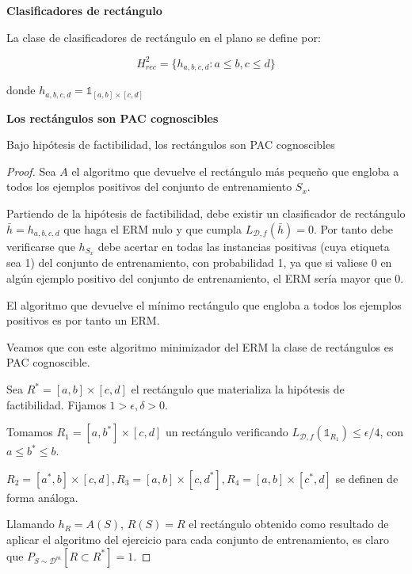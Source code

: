 \begin{example}
  \begin{definition*} \textbf{Clasificadores de rectángulo}

  La clase de clasificadores de rectángulo en el plano se define por:

  \[H^2_{rec} = \{ h_{a,b,c,d}: a\le b, c\le d\}\]

  donde $h_{a,b,c,d} = \mathds{1}_{[a,b]\times [c,d]}$
  \end{definition*}


  \begin{fact} \textbf{Los rectángulos son PAC cognoscibles}

  Bajo hipótesis de factibilidad, los rectángulos son PAC cognoscibles
  \end{fact}

    \begin{proof}
    Sea $A$ el algoritmo que devuelve el rectángulo más pequeño que engloba a todos los ejemplos positivos del conjunto de entrenamiento $S_x$.

    Partiendo de la hipótesis de factibilidad, debe existir un clasificador de rectángulo $\bar{h} = h_{a,b,c,d}$ que haga el ERM nulo y que cumpla $L_{\mathcal{D},f}(\bar{h}) = 0$. Por tanto debe verificarse que $h_{S_x}$ debe acertar en todas las instancias positivas (cuya etiqueta sea 1) del conjunto de entrenamiento, con probabilidad 1, ya que si valiese 0 en algún ejemplo positivo del conjunto de entrenamiento, el ERM sería mayor que 0.

    El algoritmo que devuelve el mínimo rectángulo que engloba a todos los ejemplos positivos es por tanto un ERM.

    Veamos que con este algoritmo minimizador del ERM la clase de rectángulos es PAC cognoscible.

    Sea $R^{\ast} = [a,b]\times [c,d]$ el rectángulo que materializa la hipótesis de factibilidad. Fijamos $1 > \epsilon, \delta > 0$.

    Tomamos $R_1 = [a,b^{\ast}] \times [c,d]$ un rectángulo verificando $L_{\mathcal{D},f}(\mathds{1}_{R_1}) \le \epsilon/4$, con $a\le b^{\ast} \le b$.

    $R_2= [a^{\ast},b] \times [c,d], R_3=[a,b] \times [c,d^{\ast}], R_4=[a,b] \times [c^{\ast},d]$ se definen de forma análoga.


    Llamando $h_{R}=A(S)$, $R(S) = R$ el rectángulo obtenido como resultado de aplicar el algoritmo del ejercicio para cada conjunto de entrenamiento, es claro que $P_{S \sim \mathcal{D}^m}[R \subset R^{\ast}] = 1$. 


\end{proof}
\end{example}
